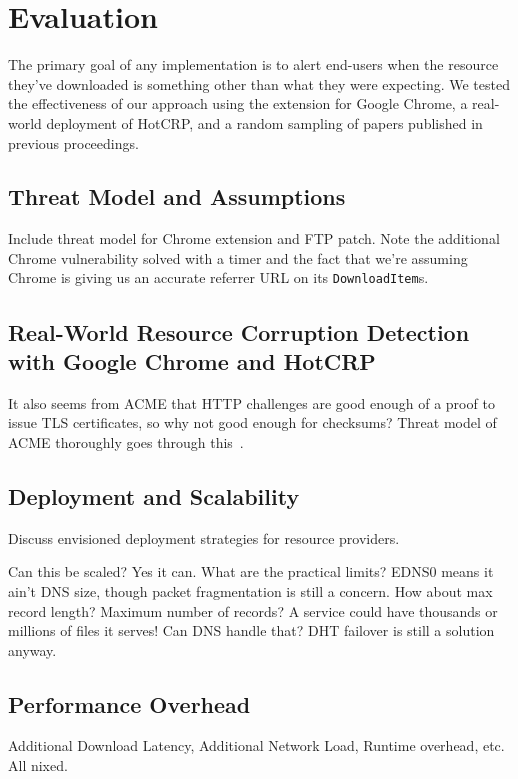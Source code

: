 \section{Evaluation} \label{sec:evaluation}

The primary goal of any \SYSTEM{} implementation is to alert end-users when the
resource they've downloaded is something other than what they were expecting. We
tested the effectiveness of our approach using the \SYSTEM{} extension for
Google Chrome, a real-world deployment of HotCRP, and a random sampling of
papers published in previous \CONFERENCE{} proceedings.

\subsection{Threat Model and Assumptions}

Include threat model for Chrome extension and FTP patch. Note the additional
Chrome vulnerability solved with a timer and the fact that we're assuming
Chrome is giving us an accurate referrer URL on its \texttt{DownloadItem}s.

\subsection{Real-World Resource Corruption Detection with Google Chrome and HotCRP}

It also seems from ACME that HTTP challenges are good enough of a proof to issue
TLS certificates, so why not good enough for checksums? Threat model of ACME
thoroughly goes through this~\cite{draft-ACME}.

\subsection{Deployment and Scalability}

Discuss envisioned deployment strategies for resource providers.

Can this be scaled? Yes it can. What are the practical limits? EDNS0 means it
ain't DNS size, though packet fragmentation is still a concern. How about max
record length? Maximum number of records? A service could have thousands or
millions of files it serves! Can DNS handle that? DHT failover is still a
solution anyway.

\subsection{Performance Overhead}

Additional Download Latency, Additional Network Load, Runtime overhead, etc. All
nixed.
